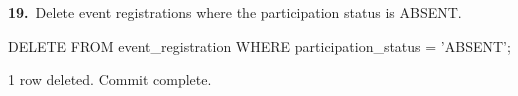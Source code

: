\noindent\begin{minipage}{\linewidth}
\begingroup{}
{\fontsize{14}{17}\selectfont\textbf{19.}}\ Delete event registrations where the participation status is ABSENT.\par
\endgroup\vspace{12pt}


\begin{sqlcode}
DELETE FROM event_registration WHERE participation_status = 'ABSENT';
\end{sqlcode}

\vspace{18pt}


\begin{sqlout}[fontsize=\small]
1 row deleted.
Commit complete.
\end{sqlout}
\end{minipage}\par\vspace{24pt}

